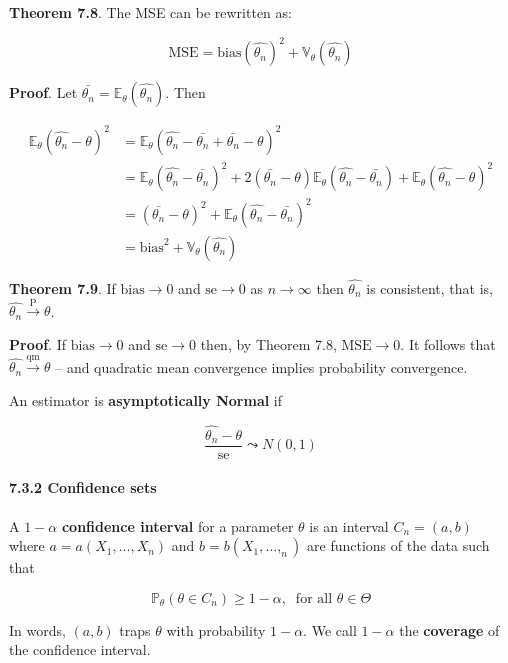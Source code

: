 \textbf{Theorem 7.8}. The MSE can be rewritten as:

\[ \text{MSE} = \text{bias}(\hat{\theta_{n}})^{2} + \mathbb{V}_\theta(\hat{\theta_{n}}) \]

\textbf{Proof}. Let
\(\bar{\theta_{n}} = \mathbb{E}_\theta(\hat{\theta_{n}})\). Then

\begin{align*}
\mathbb{E}_\theta(\hat{\theta_{n}} - \theta)^{2} & = \mathbb{E}_\theta(\hat{\theta_{n}} - \bar{\theta_{n}} + \bar{\theta_{n}} - \theta)^{2} \\
&=  \mathbb{E}_\theta(\hat{\theta_{n}} - \bar{\theta_{n}})^{2}
  + 2 (\bar{\theta_{n}} - \theta) \mathbb{E}_\theta(\hat{\theta_{n}} - \bar{\theta_{n}})
  + \mathbb{E}_\theta(\hat{\theta_{n}} - \theta)^{2} \\
&= (\bar{\theta_{n}} - \theta)^{2} + \mathbb{E}_\theta(\hat{\theta_{n}} - \bar{\theta_{n}})^{2} \\
&= \text{bias}^{2} + \mathbb{V}_\theta(\hat{\theta_{n}})
\end{align*}

\textbf{Theorem 7.9}. If \(\text{bias} \rightarrow 0\) and
\(\text{se} \rightarrow 0\) as \(n \rightarrow \infty\) then
\(\hat{\theta_{n}}\) is consistent, that is,
\(\hat{\theta_{n}} \xrightarrow{\text{P}} \theta\).

\textbf{Proof}. If \(\text{bias} \rightarrow 0\) and
\(\text{se} \rightarrow 0\) then, by Theorem 7.8,
\(\text{MSE} \rightarrow 0\). It follows that
\(\hat{\theta_{n}} \xrightarrow{\text{qm}} \theta\) -- and quadratic mean
convergence implies probability convergence.

An estimator is \textbf{asymptotically Normal} if

\[ \frac{\hat{\theta_{n}} - \theta}{\text{se}} \leadsto N(0, 1) \]

\paragraph{7.3.2 Confidence sets}\label{confidence-sets}

A \(1 - \alpha\) \textbf{confidence interval} for a parameter \(\theta\)
is an interval \(C_{n} = (a, b)\) where \(a = a(X_{1}, \dots, X_{n})\) and
\(b = b(X_{1}, \dots, _{n})\) are functions of the data such that

\[\mathbb{P}_\theta(\theta \in C_{n}) \geq 1 - \alpha, \;\; \text{for all } \theta \in \Theta\]

In words, \((a, b)\) traps \(\theta\) with probability \(1 - \alpha\).
We call \(1 - \alpha\) the \textbf{coverage} of the confidence interval.

